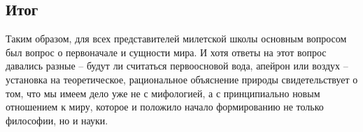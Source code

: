 \subsection{Итог}

Таким образом, для всех представителей милетской школы основным вопросом
был вопрос о первоначале и сущности мира. И хотя ответы на этот вопрос
давались разные -- будут ли считаться первоосновой вода, апейрон или
воздух -- установка на теоретическое, рациональное объяснение природы
свидетельствует о том, что мы имеем дело уже не с мифологией, а с
принципиально новым отношением к миру, которое и положило начало
формированию не только философии, но и науки.

